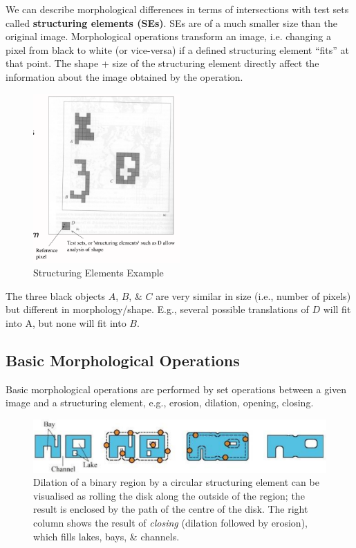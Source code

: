 \documentclass[a4paper,11pt]{article}
\begin{document}
We can describe morphological differences in terms of intersections with test sets called \textbf{structuring elements (SEs)}.
SEs are of a much smaller size than the original image.
Morphological operations transform an image, i.e. changing a pixel from black to white (or vice-versa) if a defined structuring element ``fits'' at that point.
The shape + size of the structuring element directly affect the information about the image obtained by the operation.

\begin{tcolorbox}[colback=gray!10, colframe=black, title=\textbf{Structuring Elements Example}]
\begin{figure}[H]
    \centering
    \includegraphics[width=0.5\textwidth]{images/seexample.png}
    \caption{Structuring Elements Example}
\end{figure}

The three black objects $A$, $B$, \& $C$ are very similar in size (i.e., number of pixels) but different in morphology/shape.
E.g., several possible translations of $D$ will fit into A, but none will fit into $B$.
\end{tcolorbox}

\subsection{Basic Morphological Operations}
Basic morphological operations are performed by set operations between a given image and a structuring element, e.g., erosion, dilation, opening, closing.

\begin{figure}[H]
    \centering
    \includegraphics[width=\textwidth]{images/dilationofbinaryregion.png}
    \caption{
        Dilation of a binary region by a circular structuring element can be visualised as rolling the disk along the outside of the region; the result is enclosed by the path of the centre of the disk.
        The right column shows the result of \textit{closing} (dilation followed by erosion), which fills lakes, bays, \& channels.
    }
\end{figure}
\end{document}
